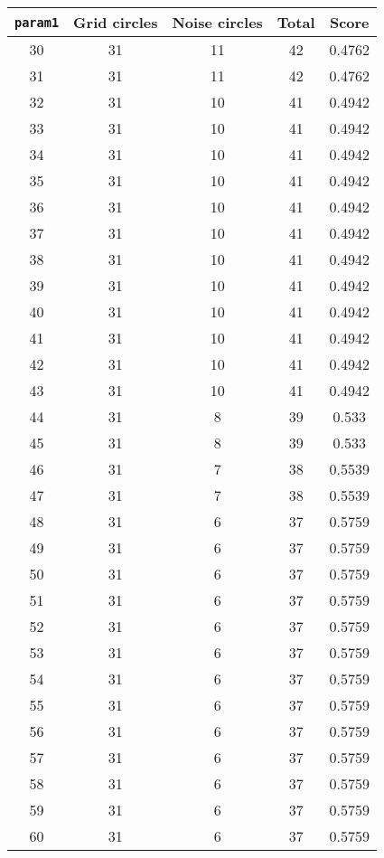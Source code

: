 \documentclass[letterpaper, 12pt]{article}
\begin{document}
\begin{longtable}{|c|c|c|c|c|}
\hline
\textbf{\texttt{param1}} & \textbf{Grid circles} & \textbf{Noise circles} & \textbf{Total} & \textbf{Score} \\
\hline
30 & 31 & 11 & 42 & 0.4762 \\
\hline
31 & 31 & 11 & 42 & 0.4762 \\
\hline
32 & 31 & 10 & 41 & 0.4942 \\
\hline
33 & 31 & 10 & 41 & 0.4942 \\
\hline
34 & 31 & 10 & 41 & 0.4942 \\
\hline
35 & 31 & 10 & 41 & 0.4942 \\
\hline
36 & 31 & 10 & 41 & 0.4942 \\
\hline
37 & 31 & 10 & 41 & 0.4942 \\
\hline
38 & 31 & 10 & 41 & 0.4942 \\
\hline
39 & 31 & 10 & 41 & 0.4942 \\
\hline
40 & 31 & 10 & 41 & 0.4942 \\
\hline
41 & 31 & 10 & 41 & 0.4942 \\
\hline
42 & 31 & 10 & 41 & 0.4942 \\
\hline
43 & 31 & 10 & 41 & 0.4942 \\
\hline
44 & 31 & 8 & 39 & 0.533 \\
\hline
45 & 31 & 8 & 39 & 0.533 \\
\hline
46 & 31 & 7 & 38 & 0.5539 \\
\hline
47 & 31 & 7 & 38 & 0.5539 \\
\hline
48 & 31 & 6 & 37 & 0.5759 \\
\hline
49 & 31 & 6 & 37 & 0.5759 \\
\hline
50 & 31 & 6 & 37 & 0.5759 \\
\hline
51 & 31 & 6 & 37 & 0.5759 \\
\hline
52 & 31 & 6 & 37 & 0.5759 \\
\hline
53 & 31 & 6 & 37 & 0.5759 \\
\hline
54 & 31 & 6 & 37 & 0.5759 \\
\hline
55 & 31 & 6 & 37 & 0.5759 \\
\hline
56 & 31 & 6 & 37 & 0.5759 \\
\hline
57 & 31 & 6 & 37 & 0.5759 \\
\hline
58 & 31 & 6 & 37 & 0.5759 \\
\hline
59 & 31 & 6 & 37 & 0.5759 \\
\hline
60 & 31 & 6 & 37 & 0.5759 \\
\hline

\end{longtable}
\end{document}
